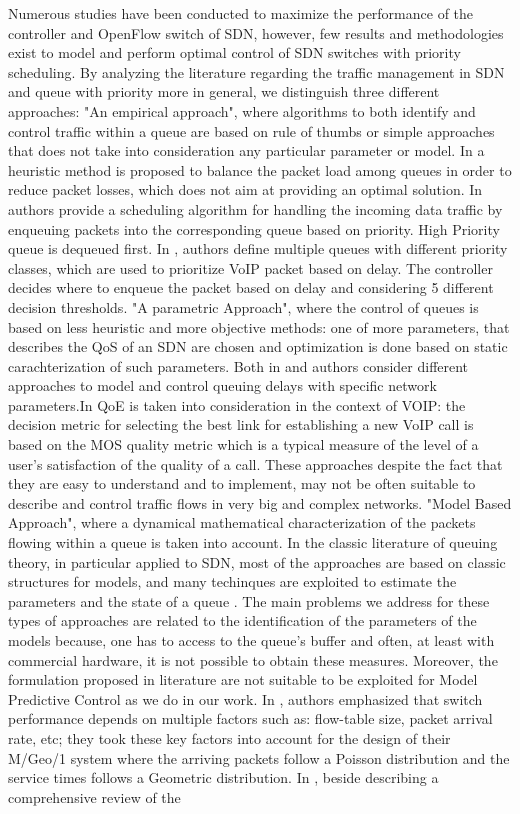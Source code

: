Numerous studies have been conducted to maximize the performance of the controller and OpenFlow switch of SDN, however, few results and methodologies exist to model and perform optimal control of SDN switches with priority scheduling. By analyzing the literature regarding the traffic management in SDN and queue with priority more in general, we distinguish three different approaches:  "An empirical approach", where algorithms to both identify and control traffic within a queue are based on rule of thumbs or simple approaches that does not take into consideration any particular parameter or model. In \cite{Boero2016} a heuristic method is proposed to balance the packet load among queues in order to reduce packet losses, which does not aim at providing an optimal solution. In \cite{Umadevi} authors provide a scheduling algorithm for handling the incoming data traffic by enqueuing packets into the corresponding queue based on priority. High Priority queue is dequeued first. In \cite{Olariu}, authors define multiple queues with different priority classes, which are used to prioritize VoIP packet based on delay. The controller decides where to enqueue the packet based on delay and considering 5 different decision thresholds. "A parametric Approach", where the control of queues is based on less heuristic and more objective methods: one of more parameters, that describes the QoS of an SDN are chosen and optimization is done based on static carachterization of such parameters. Both in \cite{Haiyan} and \cite{ChenWang} authors consider different approaches to model and control queuing delays with specific network parameters.In \cite{Najjar} QoE is taken into consideration in the context of VOIP: the decision metric for selecting the best link for establishing a new VoIP call is based on the MOS quality metric which is a typical measure of the level of a user’s satisfaction of the quality of a call. These approaches despite the fact that they are easy to understand and to implement, may not be often suitable to describe and control traffic flows in very big and complex networks. "Model Based Approach", where a dynamical mathematical characterization of the packets flowing within a queue is taken into account. In the classic literature of queuing theory, in particular applied to SDN, most of the approaches are based on classic structures for models, \cite{MDPSDNSURV} and many techinques are exploited to estimate the parameters and the state of a queue \cite{ParameterStateEst}. The main problems we address for these types of approaches are related to the identification of the parameters of the models because, one has to access to the queue's buffer and often, at least with commercial hardware, it is not possible to obtain these measures. Moreover, the formulation proposed in literature are not suitable to be exploited for Model Predictive Control as we do in our work. In \cite{Sood2016PerformanceAO}, authors emphasized that switch performance depends on multiple factors such as: flow-table size, packet arrival rate, etc; they took these key factors into account for the design of their M/Geo/1 system where the arriving packets follow a Poisson distribution and the service times follows a Geometric distribution. In \cite{SINGH201824}, beside describing a comprehensive review of the 